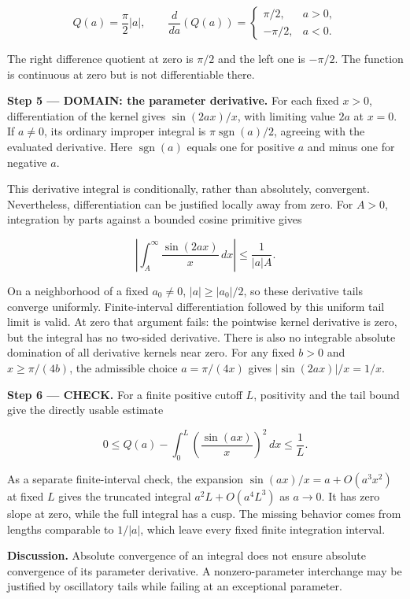 \documentclass[11pt,oneside,openany]{book}
\begin{document}
\[
Q(a)=\frac\pi2|a|,\qquad
\frac{d}{da}(Q(a))=
\begin{cases}\pi/2,&a>0,\\-\pi/2,&a<0.\end{cases}
\]

The right difference quotient at zero is \(\pi/2\) and the left one is \(-\pi/2\). The function is continuous at zero but is not differentiable there.

\begin{DomainStep}
\textbf{Step 5 --- DOMAIN: the parameter derivative.} For each fixed \(x>0\), differentiation of the kernel gives \(\sin(2ax)/x\), with limiting value \(2a\) at \(x=0\). If \(a\ne0\), its ordinary improper integral is \(\pi\operatorname{sgn}(a)/2\), agreeing with the evaluated derivative. Here \(\operatorname{sgn}(a)\) equals one for positive \(a\) and minus one for negative \(a\).

This derivative integral is conditionally, rather than absolutely, convergent. Nevertheless, differentiation can be justified locally away from zero. For \(A>0\), integration by parts against a bounded cosine primitive gives

\[
\left|\int_A^\infty\frac{\sin(2ax)}x\,dx\right|
\le\frac1{|a|A}.
\]

On a neighborhood of a fixed \(a_0\ne0\), \(|a|\ge|a_0|/2\), so these derivative tails converge uniformly. Finite-interval differentiation followed by this uniform tail limit is valid. At zero that argument fails: the pointwise kernel derivative is zero, but the integral has no two-sided derivative. There is also no integrable absolute domination of all derivative kernels near zero. For any fixed \(b>0\) and \(x\ge\pi/(4b)\), the admissible choice \(a=\pi/(4x)\) gives \(|\sin(2ax)|/x=1/x\).

\end{DomainStep}
\textbf{Step 6 --- CHECK.} For a finite positive cutoff \(L\), positivity and the tail bound give the directly usable estimate

\[
0\le Q(a)-\int_0^L\left(\frac{\sin(ax)}x\right)^2\,dx\le\frac1L.
\]

As a separate finite-interval check, the expansion \(\sin(ax)/x=a+O(a^3x^2)\) at fixed \(L\) gives the truncated integral \(a^2L+O(a^4L^3)\) as \(a\to0\). It has zero slope at zero, while the full integral has a cusp. The missing behavior comes from lengths comparable to \(1/|a|\), which leave every fixed finite integration interval.

\textbf{Discussion.} Absolute convergence of an integral does not ensure absolute convergence of its parameter derivative. A nonzero-parameter interchange may be justified by oscillatory tails while failing at an exceptional parameter.
\clearpage
\end{document}
